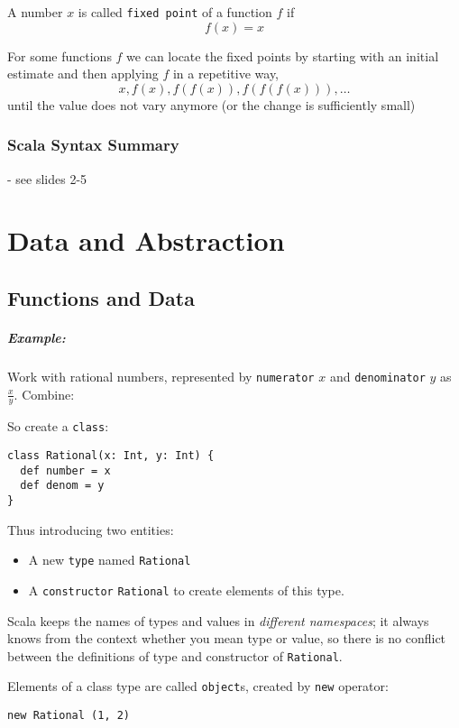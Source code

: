 \documentclass{scrartcl}
\newcommand{\example}{\subparagraph{Example:}} %
\newcommand{\term}[1]{\verb~#1~} %
\begin{document}
A number $x$ is called \term{fixed point} of a function $f$ if
$$f(x) = x$$

For some functions $f$ we can locate the fixed points by starting with an
initial estimate and then applying $f$ in a repetitive way,
$$x, f(x), f(f(x)), f(f(f(x))), \dots$$
until the value does not vary anymore (or the change is sufficiently small)

\subsubsection{Scala Syntax Summary}
\label{sec:SyntaxSummary}

- see slides 2-5

\section{Data and Abstraction}
\label{sec:DataAndAbstraction}
\subsection{Functions and Data}
\label{sec:FunctionsAndData}

\example Work with rational numbers, represented by \term{numerator} $x$ and
\term{denominator} $y$ as $\frac xy$. Combine:

So create a \lstinline{class}:
\begin{lstlisting}
class Rational(x: Int, y: Int) {
  def number = x
  def denom = y
}
\end{lstlisting}

Thus introducing two entities:
\begin{itemize}
\item A new \term{type} named \lstinline{Rational}
\item A \term{constructor} \lstinline|Rational| to create elements of this type.
\end{itemize}

Scala keeps the names of types and values in {\it different namespaces}; it
always knows from the context whether you mean type or value, so there is no
conflict between the definitions of type and constructor of
\lstinline{Rational}.

Elements of a class type are called \lstinline{object}s, created by
\lstinline{new} operator:

\begin{lstlisting}
new Rational (1, 2)
\end{lstlisting}
\end{document}
